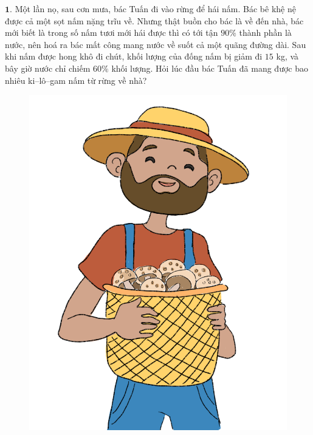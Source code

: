 \begin{multicols}{2}
	$\pmb{1.}$ Một lần nọ, sau cơn mưa, bác Tuấn đi vào rừng để hái nấm. Bác bê khệ nệ được cả một sọt nấm nặng trĩu về. Nhưng thật buồn cho bác là về đến nhà, bác mới biết là trong số nấm tươi mới hái được thì có tới tận $90\%$ thành phần là nước, nên hoá ra bác mất công mang nước về suốt cả một quãng đường dài. Sau khi nấm được hong khô đi chút, khối lượng của đống nấm bị giảm đi $15$ kg, và bây giờ nước chỉ chiếm $60\%$ khối lượng. Hỏi lúc đầu bác Tuấn đã mang được bao nhiêu ki--lô--gam nấm từ rừng về nhà?
	
	\columnbreak
	\begin{figure}[H]
		\centering
		\captionsetup{labelformat= empty, justification=centering}
		\includegraphics[width=0.65\linewidth]{bai1}
	\end{figure}
	\end{multicols}
